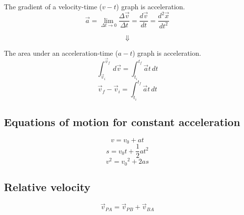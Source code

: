 \documentclass[11pt]{article}
\begin{document}
The gradient of a velocity-time (\(v-t\)) graph is acceleration.
\[\vec{a} = \lim_{\Delta t \rightarrow 0} \frac{\Delta \vec{v}}{\Delta t} = \frac{d \vec{v}}{dt} = \frac{d^2 \vec{x}}{dt^2}\]

\[\Downarrow\]

The area under an acceleration-time (\(a-t\)) graph is acceleration.
\[\int_{\vec{v}_i}^{\vec{v}_f} \, d \vec{v} = \int_{t_i}^{t_f} \vec{a} t \, dt\]
\[\vec{v}_f - \vec{v}_i = \int_{t_i}^{t_f} \vec{a} t \, dt\]


\subsection{Equations of motion for constant acceleration}
\label{sec:orgb7790e2}

\[v = v_0 + at \tag{1}\]
\[s = v_0t + \frac{1}{2} at^2 \tag{2}\]
\[v^2 = {v_0}^2 + 2as \tag{3}\]

\subsection{Relative velocity}
\label{sec:org4c25b6e}
\[\vec{v}_{PA} = \vec{v}_{PB} + \vec{v}_{BA}\]
\end{document}
